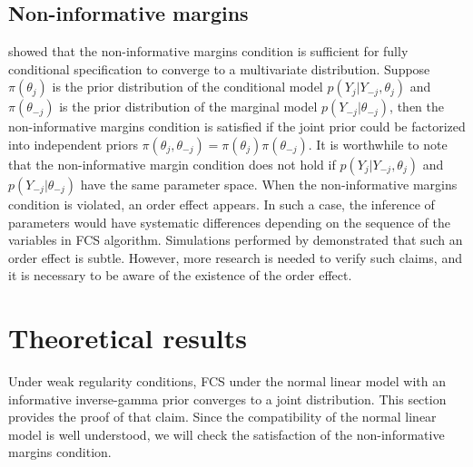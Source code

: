 	\subsection{Non-informative margins}
	\citet{hughes2014joint} showed that the non-informative margins condition is sufficient for fully conditional specification to converge to a multivariate distribution. Suppose $\pi(\theta_{j})$ is the prior distribution of the conditional model $p(Y_j|Y_{-j}, \theta_{j})$ and $\pi(\theta_{-j})$ is the prior distribution of the marginal model $p(Y_{-j}|\theta_{-j})$, then the non-informative margins condition is satisfied if the joint prior could be factorized into independent priors $\pi(\theta_{j}, \theta_{-j}) = \pi(\theta_{j})\pi(\theta_{-j})$. It is worthwhile to note that the non-informative margin condition does not hold if $p(Y_j|Y_{-j}, \theta_{j})$ and $p(Y_{-j}|\theta_{-j})$ have the same parameter space. When the non-informative margins condition is violated, an order effect appears. In such a case, the inference of parameters would have systematic differences depending on the sequence of the variables in FCS algorithm. Simulations performed by \citet{hughes2014joint} demonstrated that such an order effect is subtle. However, more research is needed to verify such claims, and it is necessary to be aware of the existence of the order effect. 
	
	\section{Theoretical results}
	Under weak regularity conditions, FCS under the normal linear model with an informative inverse-gamma prior converges to a joint distribution. This section provides the proof of that claim. Since the compatibility of the normal linear model is well understood,  we will check the satisfaction of the non-informative margins condition. 
	
